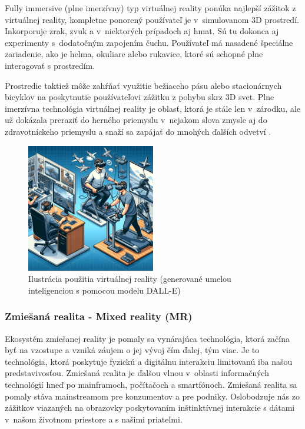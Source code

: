 Fully immersive (plne imerzívny) typ virtuálnej reality ponúka najlepší zážitok z virtuálnej reality, kompletne ponorený používateľ je v~simulovanom 3D prostredí. Inkorporuje zrak, zvuk a v~niektorých prípadoch aj hmat. Sú tu dokonca aj experimenty s~dodatočným zapojením čuchu. Používateľ má nasadené špeciálne zariadenie, ako je helma, okuliare alebo rukavice, ktoré sú schopné plne interagovať s prostredím.

Prostredie taktiež môže zahŕňať využitie bežiaceho pásu alebo stacionárnych bicyklov na poskytnutie používateľovi zážitku z pohybu skrz 3D svet. Plne imerzívna technológia virtuálnej reality je oblasť, ktorá je stále len v~zárodku, ale už dokázala preraziť do herného priemyslu v~nejakom slova zmysle aj do zdravotníckeho priemyslu a snaží sa zapájať do mnohých ďalších odvetví \cite{sheldon2022vr}.%

\begin{figure}[h]
  \centering
  \includegraphics[width=0.5\textwidth]{img/virtualna_realita.png}
  \caption{Ilustrácia použitia virtuálnej reality (generované umelou inteligenciou s pomocou modelu DALL-E)}
  \label{fig:vir_real}
\end{figure}

\subsubsection{Zmiešaná realita - Mixed reality (MR)}


Ekosystém zmiešanej reality je pomaly sa vynárajúca technológia, ktorá začína byť na vzostupe a vzniká záujem o jej vývoj čím ďalej, tým viac. Je to technológia, ktorá poskytuje fyzickú a digitálnu interakciu limitovanú iba našou predstavivosťou. Zmiešaná realita je ďalšou vlnou v~oblasti informačných technológií hneď po mainframoch, počítačoch a smartfónoch. Zmiešaná realita sa pomaly stáva mainstreamom pre konzumentov a pre podniky. Oslobodzuje nás zo zážitkov viazaných na obrazovky poskytovaním inštinktívnej interakcie s dátami v~našom životnom priestore a s našimi priateľmi. 

